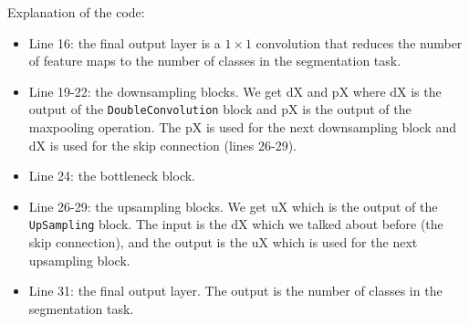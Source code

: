 \documentclass{article}
\begin{document}
Explanation of the code:

\begin{itemize}
    \item Line 16: the final output layer is a $1 \times 1$ convolution that reduces the number of feature maps to the number of classes in the segmentation task.
    \item Line 19-22: the downsampling blocks. We get dX and pX where dX is the output of the \texttt{DoubleConvolution} block and pX is the output of the maxpooling operation. The pX is used for the next downsampling block and dX is used for the skip connection (lines 26-29).
    \item Line 24: the bottleneck block.
    \item Line 26-29: the upsampling blocks. We get uX which is the output of the \texttt{UpSampling} block. The input is the dX which we talked about before (the skip connection), and the output is the uX which is used for the next upsampling block.
    \item Line 31: the final output layer. The output is the number of classes in the segmentation task.
\end{itemize}
\end{document}

